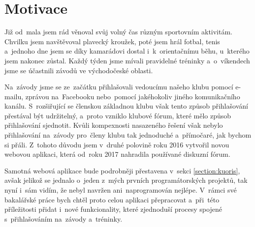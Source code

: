 \section{Motivace}
Již od~mala jsem rád věnoval svůj volný čas různým sportovním aktivitám. Chvilku jsem navštěvoval plavecký kroužek, poté jsem hrál fotbal, tenis a~jednoho dne jsem se díky kamarádovi dostal i~k~orientačnímu běhu, u~kterého jsem nakonec zůstal. Každý týden jsme mívali pravidelné tréninky a~o~víkendech jsme se účastnili závodů ve východočeské oblasti.

Na~závody jsme se ze~začátku přihlašovali vedoucímu našeho klubu pomocí e-mailu, zprávou na~Facebooku nebo~pomocí jakéhokoliv jiného komunikačního kanálu. S~rozšiřující se členskou základnou klubu však tento způsob přihlašování přestával být udržitelný, a~proto vzniklo klubové fórum, které mělo způsob přihlašování sjednotit. Kvůli kompexnosti nasazeného řešení však nebylo přihlašování na~závody pro~členy klubu tak jednoduché a~přímočaré, jak bychom si přáli. Z~tohoto důvodu jsem v~druhé polovině roku 2016 vytvořil novou webovou aplikaci, která od~roku 2017 nahradila používané diskuzní fórum.

Samotná webová aplikace bude podrobněji přestavena v~sekci \ref{section:kuoris}, avšak jelikož se jednalo o~jeden z~mých prvních programátorských projektů, tak nyní i~sám vidím, že nebyl navržen ani~naprogramován nejlépe. V~rámci své bakalářské práce bych chtěl proto celou aplikaci přepracovat a~při~této příležitosti přidat i~nové funkcionality, které zjednoduší procesy spojené s~přihlašováním na~závody a~tréninky.

